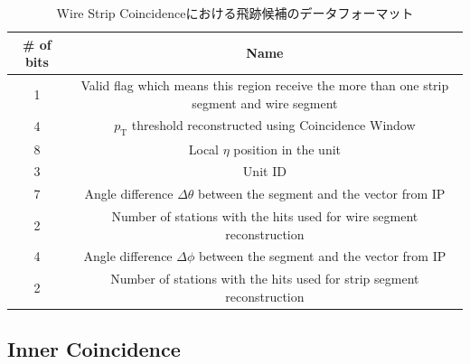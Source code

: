 \begin{table}[]
    \centering
    \caption{Wire Strip Coincidenceにおける飛跡候補のデータフォーマット}
    \label{tab:WS}
    \begin{tabular}{|c|c|}
    \hline
    \# of bits & Name                                                                                        \\ \hline\hline
    1          & Valid flag which means this region receive the more than one strip segment and wire segment \\ \hline
    4          & $p_{\mathrm{T}}$ threshold reconstructed using Coincidence Window                           \\ \hline
    8          & Local $\eta$ position in the unit                                                           \\ \hline
    3          & Unit ID                                                                                     \\ \hline
    7          & Angle difference $\Delta\theta$ between the segment and the vector from IP                    \\ \hline
    2          & Number of stations with the hits used for wire segment reconstruction                       \\ \hline
    4          & Angle difference $\Delta\phi$ between the segment and the vector from IP                    \\ \hline
    2          & Number of stations with the hits used for strip segment reconstruction                      \\ \hline
    \end{tabular}
\end{table}

\subsection{Inner Coincidence}
